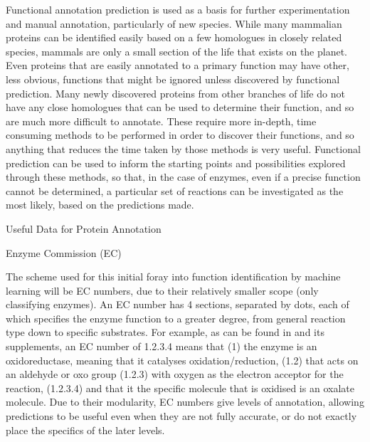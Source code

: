 \documentclass[12pt]{article}
\makeatletter
\renewcommand\subsubsection{\@startsection{subsubsection}{4}{\z@}
            {-2.5ex\@plus -1ex \@minus -.25ex}
            {1ex \@plus .25ex}
            {\normalfont\large\bfseries}}
\renewcommand\subsection{\@startsection{subsection}{4}{\z@}
            {-2.5ex\@plus -1ex \@minus -.25ex}
            {1ex \@plus .25ex}
            {\normalfont\Large\bfseries}}
\makeatother
\begin{document}
			Functional annotation prediction is used as a basis for further experimentation and manual annotation, particularly of new species.  While many mammalian proteins can be identified easily based on a few homologues in closely related species, mammals are only a small section of the life that exists on the planet.  Even proteins that are easily annotated to a primary function may have other, less obvious, functions that might be ignored unless discovered by functional prediction.  Many newly discovered proteins from other branches of life do not have any close homologues that can be used to determine their function, and so are much more difficult to annotate.  These require more in-depth, time consuming methods to be performed in order to discover their functions, and so anything that reduces the time taken by those methods is very useful.  Functional prediction can be used to inform the starting points and possibilities explored through these methods, so that, in the case of enzymes, even if a precise function cannot be determined, a particular set of reactions can be investigated as the most likely, based on the predictions made.  
			
		\subsection{Useful Data for Protein Annotation}  
			
			\subsubsection{Enzyme Commission (EC)}

			The scheme used for this initial foray into function identification by machine learning will be EC numbers, due to their relatively smaller scope (only classifying enzymes).  An EC number has 4 sections, separated by dots, each of which specifies the enzyme function to a greater degree, from general reaction type down to specific substrates. For example, as can be found in \cite{RefWorks:doc:5d70e98ce4b0ef464262611a} and its supplements, an EC number of 1.2.3.4 means that (1) the enzyme is an oxidoreductase, meaning that it catalyses oxidation/reduction, (1.2) that acts on an aldehyde or oxo group (1.2.3) with oxygen as the electron acceptor for the reaction, (1.2.3.4) and that it the specific molecule that is oxidised is an oxalate molecule.  Due to their modularity, EC numbers give levels of annotation, allowing predictions to be useful even when they are not fully accurate, or do not exactly place the specifics of the later levels.
			
\end{document}
